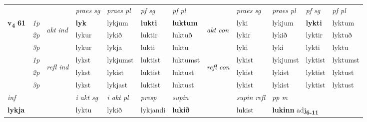 \begin{longtable}[l]{X>{\footnotesize\itshape}llXXXXlXXXX}
 & &   & \textit{praes sg}  & \textit{praes pl}    & \textit{ pf sg} & \textit{pf pl} & & \textit{praes sg}  & \textit{praes pl}    & \textit{pf sg} & \textit{pf pl }  \\ \cmidrule{4-7} \cmidrule{9-12}
 \multirow{2}{*}{{{\textbf{v{\textsubscript{4}}} \Large{\textbf{61}}}}}  & 1p & \multirow{3}{*}{\begin{turn}{90}\textit{akt ind}\end{turn}} & \textbf{lyk} & lykjum & \textbf{lukti} & \textbf{luktum} & \multirow{3}{*}{\begin{turn}{90}\textit{akt con}\end{turn}} &lyki & lykjum & \textbf{lykti} & lyktum\\*
 & 2p &  &  lykur  & lykið & luktir & luktuð & & lykir & lykið & lyktir & lyktuð \\*
 & 3p &  & lykur & lykja & lukti & luktu & & lyki & lyki& lykti & lyktu \\*
\cmidrule{4-7} \cmidrule{9-12}
 & 1p & \multirow{3}{*}{\begin{turn}{90}\textit{refl ind}\end{turn}}  & lykst & lykjumst & luktist & luktumst & \multirow{3}{*}{\begin{turn}{90}\textit{refl con}\end{turn}}  &lykist & lykjumst & lyktist & lyktumst \\*
 & 2p &  & lykst & lykist & luktist & luktust & &lykist & lykist & lyktist & lyktust \\*
 & 3p  & & lykst & lykjast & luktist & luktust & & lykist & lykist& lyktist & lyktust \\*
\cmidrule{4-7} \cmidrule{9-12}

   {\textit{inf}} & &  & \textit{i akt sg} & \textit{i akt pl}   & \textit{presp} & \textit{supin} && \textit{supin refl} & \textit{pp m} \\*
  {\textbf{lykja}} & && lyktu  & lykið   & lykjandi &  \textbf{lukið} && lukist & \multicolumn{2}{l}{\textbf{lukinn} adj\textbf{\textsubscript{6-11}}} \\*

\midrule


\end{longtable}
